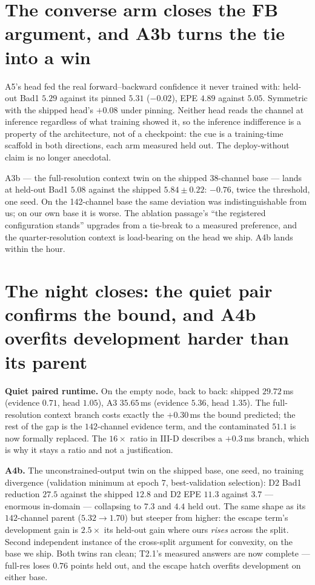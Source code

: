 \documentclass[11pt,a4paper]{article}
\begin{document}
\section*{The converse arm closes the FB argument, and A3b turns the tie into a win}

A5's head fed the real forward--backward confidence it never trained with:
held-out Bad1 $5.29$ against its pinned $5.31$ ($-0.02$), EPE $4.89$ against
$5.05$. Symmetric with the shipped head's $+0.08$ under pinning. Neither head
reads the channel at inference regardless of what training showed it, so the
inference indifference is a property of the architecture, not of a
checkpoint: the cue is a training-time scaffold in both directions, each arm
measured held out. The deploy-without claim is no longer anecdotal.

A3b --- the full-resolution context twin on the shipped 38-channel base ---
lands at held-out Bad1 $5.08$ against the shipped $5.84\pm0.22$: $-0.76$,
twice the threshold, one seed. On the 142-channel base the same deviation was
indistinguishable from us; on our own base it is worse. The ablation
passage's ``the registered configuration stands'' upgrades from a tie-break
to a measured preference, and the quarter-resolution context is load-bearing
on the head we ship. A4b lands within the hour.



\section*{The night closes: the quiet pair confirms the bound, and A4b overfits development harder than its parent}

\textbf{Quiet paired runtime.} On the empty node, back to back: shipped
$29.72$\,ms (evidence $0.71$, head $1.05$), A3 $35.65$\,ms (evidence $5.36$,
head $1.35$). The full-resolution context branch costs exactly the
$+0.30$\,ms the bound predicted; the rest of the gap is the $142$-channel
evidence term, and the contaminated $51.1$ is now formally replaced. The
$16\times$ ratio in III-D describes a $+0.3$\,ms branch, which is why it
stays a ratio and not a justification.

\textbf{A4b.} The unconstrained-output twin on the shipped base, one seed, no
training divergence (validation minimum at epoch $7$, best-validation
selection): D2 Bad1 reduction $27.5$ against the shipped $12.8$ and D2 EPE
$11.3$ against $3.7$ --- enormous in-domain --- collapsing to $7.3$ and
$4.4$ held out. The same shape as its $142$-channel parent
($5.32 \to 1.70$) but steeper from higher: the escape term's development
gain is $2.5\times$ its held-out gain where ours \emph{rises} across the
split. Second independent instance of the cross-split argument for
convexity, on the base we ship. Both twins ran clean; T2.1's measured
answers are now complete --- full-res loses $0.76$ points held out, and the
escape hatch overfits development on either base.
\end{document}
